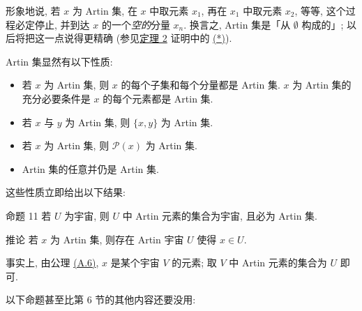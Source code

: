 形象地说\pageoriginale, 若 $x$ 为 Artin 集, 在 $x$ 中取元素 $x_1$, 再在 $x_1$ 中取元素 $x_2$, 等等, 这个过程必定停止, 并到达 $x$ 的一个\emph{空的}分量 $x_n$. 换言之, Artin 集是「从 $∅$ 构成的」; 以后将把这一点说得更精确 (参见\hyperlink{sga4.exp.I.appendix.II.sec.6.theorem.2}{定理 2} 证明中的 \hyperlink{sga4.exp.I.appendix.II.sec.6.theorem.2.proof.claim.star}{(*)}).

Artin 集显然有以下性质:
\begin{itemize}
\hypertarget{sga4.exp.I.appendix.II.sec.6.property.AR.I}{}
\item[(AR.I)] 若 $x$ 为 Artin 集, 则 $x$ 的每个子集和每个分量都是 Artin 集. $x$ 为 Artin 集的充分必要条件是 $x$ 的每个元素都是 Artin 集.

\hypertarget{sga4.exp.I.appendix.II.sec.6.property.AR.II}{}
\item[(AR.II)] 若 $x$ 与 $y$ 为 Artin 集, 则 $\{x,y\}$ 为 Artin 集.

\hypertarget{sga4.exp.I.appendix.II.sec.6.property.AR.III}{}
\item[(AR.III)] 若 $x$ 为 Artin 集, 则 $\mathcal{P}(x)$ 为 Artin 集.

\hypertarget{sga4.exp.I.appendix.II.sec.6.property.AR.IV}{}
\item[(AR.IV)] Artin 集的任意并仍是 Artin 集.
\end{itemize}

这些性质立即给出以下结果:

\hypertarget{sga4.exp.I.appendix.II.sec.6.proposition.11}{}
\begin{enonce*}{命题 11}
若 $U$ 为宇宙, 则 $U$ 中 Artin 元素的集合为宇宙, 且必为 Artin 集.
\end{enonce*}

\hypertarget{sga4.exp.I.appendix.II.sec.6.corollary.to.proposition.11}{}
\begin{enonce*}{推论}
若 $x$ 为 Artin 集, 则存在 Artin 宇宙 $U$ 使得 $x\in U$.
\end{enonce*}

事实上, 由公理 \hyperlink{sga4.exp.I.appendix.II.sec.4.axiom.A.6}{(A.6)}, $x$ 是某个宇宙 $V$ 的元素; 取 $V$ 中 Artin 元素的集合为 $U$ 即可.

以下命题甚至比第 6 节的其他内容还要没用:

